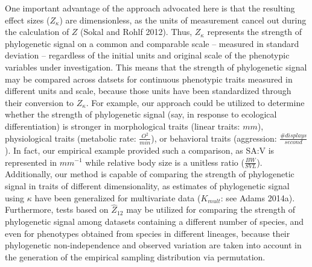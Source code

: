 \documentclass[]{article}
\begin{document}
One important advantage of the approach advocated here is that the
resulting effect sizes (\(Z_\kappa\)) are dimensionless, as the units of
measurement cancel out during the calculation of \(Z\) (Sokal and Rohlf
2012). Thus, \(Z_\kappa\) represents the strength of phylogenetic signal
on a common and comparable scale -- measured in standard deviation --
regardless of the initial units and original scale of the phenotypic
variables under investigation. This means that the strength of
phylogenetic signal may be compared across datsets for continuous
phenotypic traits measured in different units and scale, because those
units have been standardized through their conversion to \(Z_\kappa\).
For example, our approach could be utilized to determine whether the
strength of phylogenetic signal (say, in response to ecological
differentiation) is stronger in morphological traits (linear traits:
\(mm\)), physiological traits (metabolic rate: \(\frac{O^2}{min}\)), or
behavioral traits (aggression: \(\frac{\#{displays}}{second}\)). In
fact, our empirical example provided such a comparison, as SA:V is
represented in \(mm^{-1}\) while relative body size is a unitless ratio
(\(\frac{BW}{SVL}\)). Additionally, our method is capable of comparing
the strength of phylogenetic signal in traits of different
dimensionality, as estimates of phylogenetic signal using \(\kappa\)
have been generalized for multivariate data (\(K_{mult}\): see Adams
2014a). Furthermore, tests based on \(\hat{Z}_{12}\) may be utilized for
comparing the strength of phylogenetic signal among datasets containing
a different number of species, and even for phenotypes obtained from
species in different lineages, because their phylogenetic
non-independence and observed variation are taken into account in the
generation of the empirical sampling distribution via permutation.
\hfill\break
\end{document}
